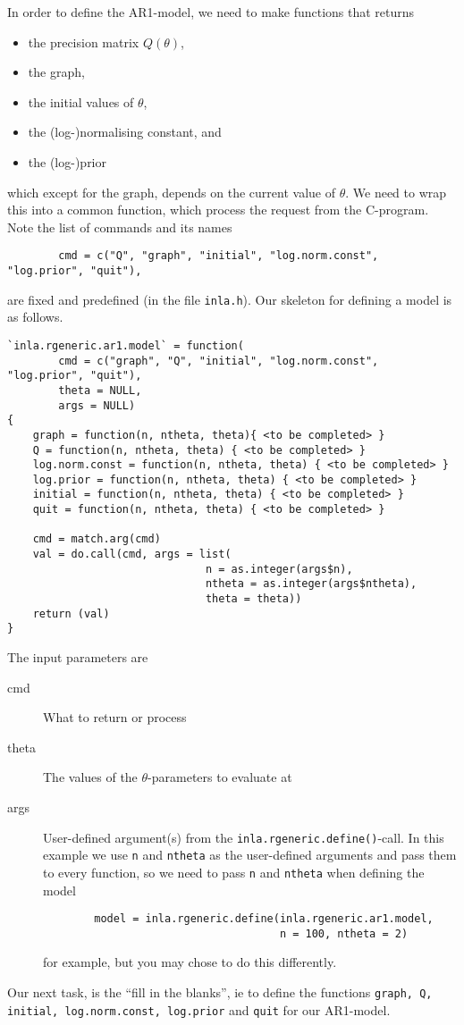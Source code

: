 \documentclass[a4paper,11pt]{article}
\begin{document}
In order to define the AR1-model, we need to make functions that
returns
\begin{itemize}
\item the precision matrix $Q(\theta)$,
\item the graph,
\item the initial values of $\theta$,
\item the (log-)normalising constant, and
\item the (log-)prior
\end{itemize}
which except for the graph, depends on the current value of
$\theta$. We need to wrap this into a common function, which process
the request from the C-program. Note the 
list of commands and its names
\begin{verbatim}
        cmd = c("Q", "graph", "initial", "log.norm.const", "log.prior", "quit"),
\end{verbatim}
are fixed and predefined (in the file \texttt{inla.h}).  Our skeleton
for defining a model is as follows.
\begin{verbatim}
`inla.rgeneric.ar1.model` = function(
        cmd = c("graph", "Q", "initial", "log.norm.const", "log.prior", "quit"),
        theta = NULL,
        args = NULL)
{
    graph = function(n, ntheta, theta){ <to be completed> }
    Q = function(n, ntheta, theta) { <to be completed> }
    log.norm.const = function(n, ntheta, theta) { <to be completed> }
    log.prior = function(n, ntheta, theta) { <to be completed> }
    initial = function(n, ntheta, theta) { <to be completed> }
    quit = function(n, ntheta, theta) { <to be completed> }

    cmd = match.arg(cmd)
    val = do.call(cmd, args = list(
                               n = as.integer(args$n),
                               ntheta = as.integer(args$ntheta), 
                               theta = theta))
    return (val)
}
\end{verbatim}
The input parameters are
\begin{description}
\item[cmd] What to return or process
\item[theta] The values of the $\theta$-parameters to evaluate at
\item[args] User-defined argument(s) from the
    \texttt{inla.rgeneric.define()}-call. In this example we use
    \texttt{n} and \texttt{ntheta} as the user-defined arguments and
    pass them to every function, so we need to pass \texttt{n} and
    \texttt{ntheta} when defining the model
\begin{verbatim}
        model = inla.rgeneric.define(inla.rgeneric.ar1.model,
                                     n = 100, ntheta = 2)
\end{verbatim}
    for example, but you may chose to do this differently.
\end{description}
Our next task, is the ``fill in the blanks'', ie to define the
functions \texttt{graph, Q, initial, log.norm.const, log.prior} and
\texttt{quit} for our AR1-model.
\end{document}
